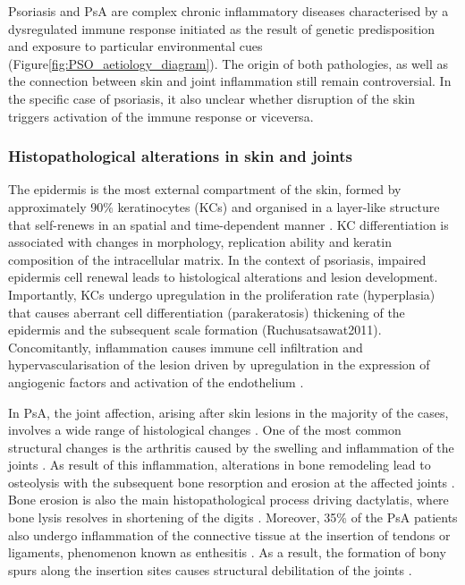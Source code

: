 Psoriasis and PsA are complex chronic inflammatory diseases characterised by a dysregulated immune response initiated as the result of genetic predisposition and exposure to particular environmental cues (Figure\ref{fig:PSO_aetiology_diagram}). The origin of both pathologies, as well as the connection between skin and joint inflammation still remain controversial. In the specific case of psoriasis, it also unclear whether disruption of the skin triggers activation of the immune response or viceversa.



\subsubsection*{Histopathological alterations in skin and joints}

The epidermis is the most external compartment of the skin, formed by approximately 90\% keratinocytes (KCs) and organised in a layer-like structure that self-renews in an spatial and time-dependent manner \parencite{Wikramanayake2014}. KC differentiation is associated with changes in morphology, replication ability and keratin composition of the intracellular matrix. In the context of psoriasis, impaired epidermis cell renewal leads to histological alterations and lesion development. Importantly, KCs undergo upregulation in the proliferation rate (hyperplasia) that causes aberrant cell differentiation (parakeratosis) thickening of the epidermis and the subsequent scale formation (Ruchusatsawat2011). Concomitantly, inflammation causes immune cell infiltration and hypervascularisation of the lesion driven by upregulation in the expression of angiogenic factors and activation of the endothelium \parencite{Perera2012}.  

In PsA, the joint affection, arising after skin lesions in the majority of the cases, involves a wide range of histological changes \parencite{Haddad2013}. One of the most common structural changes is the arthritis caused by the swelling and inflammation of the joints \parencite{Schett2011}. As result of this inflammation, alterations in bone remodeling lead to osteolysis with the subsequent bone resorption and erosion at the affected joints \parencite{Mensah2017}. Bone erosion is also the main histopathological process driving dactylatis, where bone lysis resolves in shortening of the digits \parencite{Gladman2005}. Moreover,  35\% of the PsA patients also undergo inflammation of the connective tissue at the insertion of tendons or ligaments, phenomenon known as enthesitis \parencite{McGonagle2011,Polachek2017}. As a result, the formation of bony spurs along the insertion sites causes structural debilitation of the joints \parencite  {Schett2011}. 


